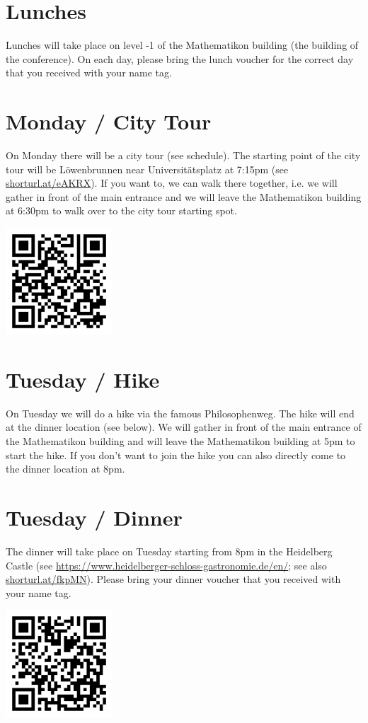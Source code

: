 \documentclass{article}
\begin{document}
\section{Lunches}
Lunches will take place on level -1 of the Mathematikon building (the building of the conference). On each day, please bring the lunch voucher for the correct day that you received with your name tag.

\section{Monday / City Tour}
On Monday there will be a city tour (see schedule). The starting point of the city tour will be Löwenbrunnen near Universitätsplatz at 7:15pm (see \url{shorturl.at/eAKRX}). If you want to, we can walk there together, i.e. we will gather in front of the main entrance and we will leave the Mathematikon building at 6:30pm to walk over to the city tour starting spot. 
\begin{center}
        \includegraphics[width=4cm]{qr-code_citytour.png}
\end{center}

\section{Tuesday / Hike}

On Tuesday we will do a hike via the famous Philosophenweg. The hike will end at the dinner location (see below). We will gather in front of the main entrance of the Mathematikon building and will leave the Mathematikon building at 5pm to start the hike. If you don't want to join the hike you can also directly come to the dinner location at 8pm.
\section{Tuesday / Dinner}
The dinner will take place on Tuesday starting from 8pm in the Heidelberg Castle (see \url{https://www.heidelberger-schloss-gastronomie.de/en/}; see also \url{shorturl.at/fkpMN}). Please bring your dinner voucher that you received with your name tag. 
\begin{center}
        \includegraphics[width=4cm]{qr-code_schloss_location.png}
\end{center}
\end{document}

